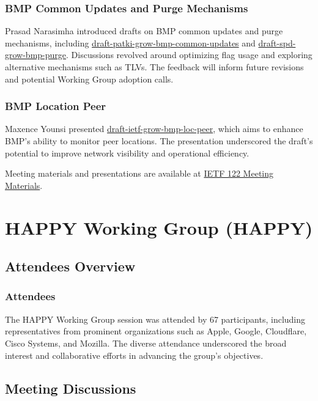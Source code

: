 \documentclass{article}
\begin{document}
\subsubsection{BMP Common Updates and Purge Mechanisms}
Prasad Narasimha introduced drafts on BMP common updates and purge mechanisms, including \href{https://datatracker.ietf.org/doc/html/draft-patki-grow-bmp-common-updates}{draft-patki-grow-bmp-common-updates} and \href{https://datatracker.ietf.org/doc/html/draft-spd-grow-bmp-purge}{draft-spd-grow-bmp-purge}. Discussions revolved around optimizing flag usage and exploring alternative mechanisms such as TLVs. The feedback will inform future revisions and potential Working Group adoption calls.

\subsubsection{BMP Location Peer}
Maxence Younsi presented \href{https://datatracker.ietf.org/doc/html/draft-ietf-grow-bmp-loc-peer}{draft-ietf-grow-bmp-loc-peer}, which aims to enhance BMP's ability to monitor peer locations. The presentation underscored the draft's potential to improve network visibility and operational efficiency.

Meeting materials and presentations are available at \href{https://datatracker.ietf.org/meeting/122/materials.html}{IETF 122 Meeting Materials}.




\newpage

\section{HAPPY Working Group (HAPPY)}

\subsection{Attendees Overview}
\subsubsection{Attendees}
The HAPPY Working Group session was attended by 67 participants, including representatives from prominent organizations such as Apple, Google, Cloudflare, Cisco Systems, and Mozilla. The diverse attendance underscored the broad interest and collaborative efforts in advancing the group's objectives.

\subsection{Meeting Discussions}
\end{document}
